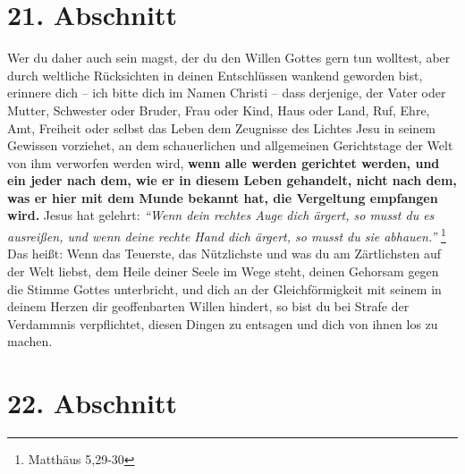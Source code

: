\section{21. Abschnitt} \label{kap4_ab21}

Wer du daher auch sein magst, der du den Willen Gottes gern tun wolltest, aber
durch weltliche Rücksichten in deinen Entschlüssen wankend geworden bist,
erinnere dich -- ich bitte dich im Namen Christi -- dass derjenige, der Vater oder
Mutter, Schwester oder Bruder, Frau oder Kind, Haus oder Land, Ruf, Ehre, Amt,
Freiheit oder selbst das Leben dem Zeugnisse des Lichtes Jesu  in seinem
Gewissen vorziehet, an dem schauerlichen und allgemeinen Gerichtstage  der Welt \label{ref:04_21_gericht}
von ihm verworfen werden wird, \textbf{wenn alle werden gerichtet werden, und
ein jeder
nach dem, wie er in diesem Leben gehandelt, nicht nach dem, was er hier mit dem
Munde bekannt  hat, die Vergeltung empfangen wird.} Jesus hat gelehrt:
\textit{"`Wenn
dein rechtes Auge dich ärgert, so musst du es ausreißen, und wenn deine rechte
Hand dich ärgert, so musst du sie abhauen."'}
\footnote{Matthäus  5,29-30}
Das heißt:
Wenn das Teuerste, das Nützlichste und was du am Zärtlichsten auf der Welt
liebst, dem Heile deiner Seele im Wege steht, deinen Gehorsam gegen die Stimme
Gottes unterbricht, und dich an der Gleichförmigkeit mit seinem in deinem Herzen
dir geoffenbarten Willen hindert, so bist du bei Strafe der Verdammnis
verpflichtet, diesen Dingen zu entsagen und dich von ihnen los zu machen.

\section{22. Abschnitt} \label{kap4_ab22}

